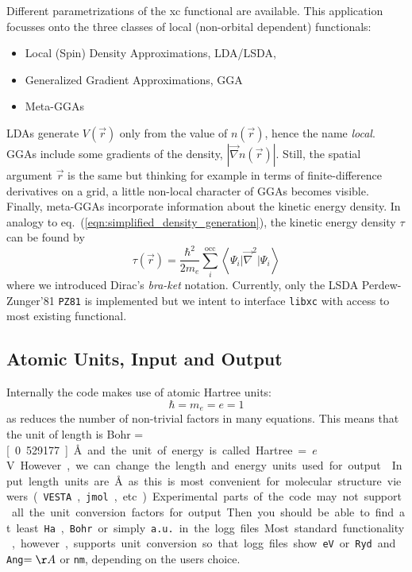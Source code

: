 \documentclass[oribibl]{llncs}
\newcommand{\ttt}[1]{\texttt{#1}}
\newcommand{\braketop}[3]{\left\langle \left. #1 \right| #2 \left| #3 \right. \right\rangle}
\begin{document}
Different parametrizations of the \ac{xc} functional are available.
This application focusses onto the three classes of local (non-orbital dependent) functionals: 
\begin{itemize} 
	\item Local (Spin) Density Approximations, LDA/LSDA, 
	\item Generalized Gradient Approximations, GGA
	\item Meta-GGAs
\end{itemize}
LDAs generate $V(\vec r)$ only from the value of $n(\vec r)$, 
hence the name \emph{local}. 
GGAs include some gradients of the density, $|\vec \nabla n(\vec r)|$.
Still, the spatial argument $\vec r$ is the same but thinking for example
in terms of finite-difference derivatives on a grid, 
a little non-local character of GGAs becomes visible.
Finally, meta-GGAs incorporate information about the kinetic energy density.
In analogy to eq.~(\ref{eqn:simplified_density_generation}), the kinetic energy density $\tau$ can be found by
\begin{equation}
	\tau(\vec r) = \frac{\hbar^2}{2m_e} \sum_i^{\mathrm{occ}} \braketop{ \Psi_i } {\vec \nabla^2 } { \Psi_i } 
	\label{eqn:simplified_kinetic_energy_density_generation}
\end{equation}
where we introduced Dirac's \emph{bra-ket} notation.
Currently, only the LSDA Perdew-Zunger'81 \ttt{PZ81} is implemented 
but we intent to interface \ttt{libxc} with access to most existing functional.


\subsection{Atomic Units, Input and Output}
Internally the code makes use of atomic Hartree units:
\begin{equation}
	\hbar = m_e = e = 1
\end{equation}
as reduces the number of non-trivial factors in many equations.
This means that the unit of length is Bohr = \unit[0.529177]{\AA}
and the unit of energy is called Hartree = \unit[27,2114]{$e$V}.
However, we can change the length and energy units used for output.
Input length units are \AA as this is most convenient for molecular structure viewers
(\ttt{VESTA}, \ttt{jmol}, etc.)

Experimental parts of the code may not support all the unit conversion
factors for output. Then you should be able to find at least \ttt{Ha}, \ttt{Bohr} or simply \ttt{a.u.} in the logg files.
Most standard functionality, however, supports unit conversion so that logg files
show \ttt{eV} or \ttt{Ryd} and \ttt{Ang}$ = \AA$ or \ttt{nm}, depending on the users choice.
\end{document}
